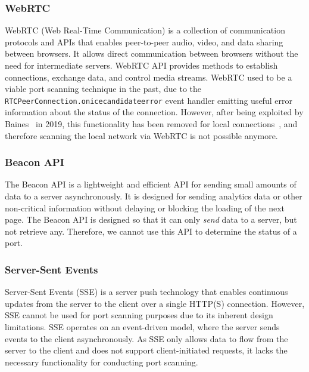 
\subsubsection{WebRTC}

WebRTC (Web Real-Time Communication) is a collection of communication protocols and APIs that enables peer-to-peer audio, video, and data sharing between browsers. It allows direct communication between browsers without the need for intermediate servers. WebRTC API provides methods to establish connections, exchange data, and control media streams.
WebRTC used to be a viable port scanning technique in the past, due to the \texttt{RTCPeerConnection.onicecandidateerror} event handler emitting useful error information about the status of the connection. However, after being exploited by Baines~ in 2019, 
this functionality has been removed for local connections~, and therefore scanning the local network via WebRTC is not possible anymore.

\subsubsection{Beacon API}

The Beacon API is a lightweight and efficient API for sending small amounts of data to a server asynchronously. It is designed for sending analytics data or other non-critical information without delaying or blocking the loading of the next page. The Beacon API is designed so that it can only \emph{send} data to a server, but not retrieve any. Therefore, we cannot use this API to determine the status of a port.

\subsubsection{Server-Sent Events}

Server-Sent Events (SSE) is a server push technology that enables continuous updates from the server to the client over a single HTTP(S) connection. However, SSE cannot be used for port scanning purposes due to its inherent design limitations. SSE operates on an event-driven model, where the server sends events to the client asynchronously. As SSE only allows data to flow from the server to the client and does not support client-initiated requests, it lacks the necessary functionality for conducting port scanning.

